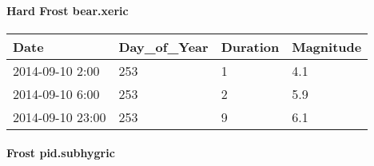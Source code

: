\documentclass[
]{article}
\begin{document}
\hypertarget{hard-frost-bear.xeric}{%
\paragraph{Hard Frost bear.xeric}\label{hard-frost-bear.xeric}}

\begin{tabular}{l|l|l|l}
\hline
Date & Day\_of\_Year & Duration & Magnitude\\
\hline
2014-09-10 2:00 & 253 & 1 & 4.1\\
\hline
2014-09-10 6:00 & 253 & 2 & 5.9\\
\hline
2014-09-10 23:00 & 253 & 9 & 6.1\\
\hline
\end{tabular}

\hypertarget{frost-pid.subhygric}{%
\paragraph{Frost pid.subhygric}\label{frost-pid.subhygric}}
\end{document}
